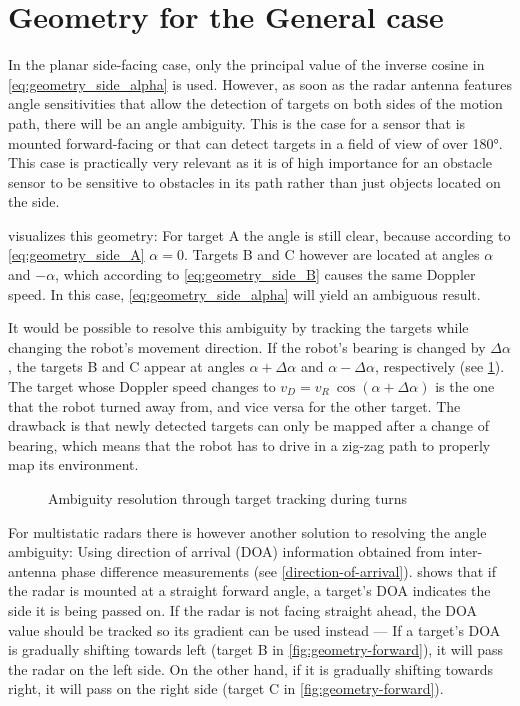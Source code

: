 \section{Geometry for the General case}\label{geometry-for-the-general-case}

In the planar side-facing case, only the principal value of the inverse cosine in \cref{eq:geometry_side_alpha} is used. However, as soon as the radar antenna features angle sensitivities that allow the detection of targets on both sides of the motion path, there will be an angle ambiguity. This is the case for a sensor that is mounted forward-facing or that can detect targets in a field of view of over 180°. This case is practically very relevant as it is of high importance for an obstacle sensor to be sensitive to obstacles in its path rather than just objects located on the side.

 visualizes this geometry: For target A the angle is still clear, because according to \cref{eq:geometry_side_A} $\alpha = 0$. Targets B and C however are located at angles $\alpha$ and $-\alpha$, which according to \cref{eq:geometry_side_B} causes the same Doppler speed. In this case, \cref{eq:geometry_side_alpha} will yield an ambiguous result.

It would be possible to resolve this ambiguity by tracking the targets while changing the robot's movement direction. If the robot's bearing is changed by $\Delta\alpha$, the targets B and C appear at angles $\alpha+\Delta\alpha$ and $\alpha-\Delta\alpha$, respectively (see \cref{fig:geometry-turn}). The target whose Doppler speed changes to $v_D = v_R~\cos(\alpha+\Delta\alpha)$ is the one that the robot turned away from, and vice versa for the other target. The drawback is that newly detected targets can only be mapped after a change of bearing, which means that the robot has to drive in a zig-zag path to properly map its environment.

\begin{figure}
    \centering
    \def\svgwidth{0.5\linewidth}
    
    \caption{Ambiguity resolution through target tracking during turns}
    \label{fig:geometry-turn}
\end{figure}

For multistatic radars there is however another solution to resolving the angle ambiguity: Using direction of arrival (DOA) information obtained from inter-antenna phase difference measurements (see \cref{direction-of-arrival}).  shows that if the radar is mounted at a straight forward angle, a target's DOA indicates the side it is being passed on. If the radar is not facing straight ahead, the DOA value should be tracked so its gradient can be used instead --- If a target's DOA is gradually shifting towards left (target B in \cref{fig:geometry-forward}), it will pass the radar on the left side. On the other hand, if it is gradually shifting towards right, it will pass on the right side (target C in \cref{fig:geometry-forward}).

